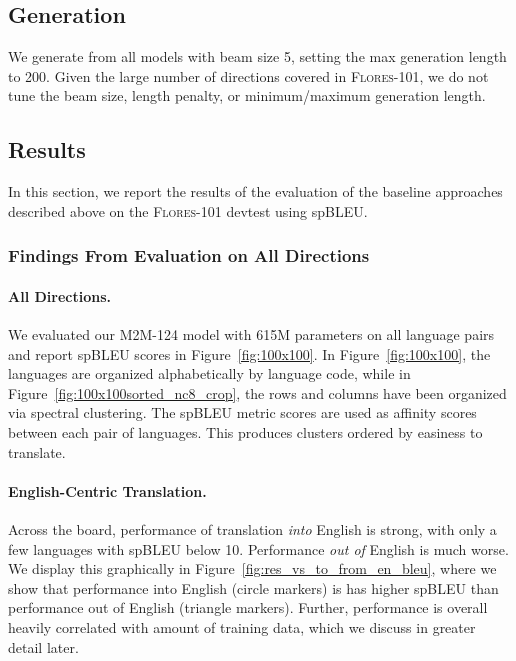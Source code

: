 \subsection{Generation}

We generate from all models with beam size 5, setting the max generation length to 200. Given the large number of directions covered in \textsc{Flores-101}, we do not tune the beam size, length penalty, or minimum/maximum generation length.

\subsection{Results}
In this section, we report the results of the evaluation of the baseline approaches described above on the \textsc{Flores-101} devtest using spBLEU. 

\subsubsection{Findings From Evaluation on All Directions} 

\paragraph{All Directions.} We evaluated our M2M-124 model with 615M parameters on all language pairs and report spBLEU scores in Figure~\ref{fig:100x100}.
In Figure~\ref{fig:100x100}, the languages are organized alphabetically by language code, while in Figure~\ref{fig:100x100sorted_nc8_crop}, the rows and columns have been organized via spectral clustering. The spBLEU metric scores are used as affinity scores between each pair of languages. This produces clusters ordered by easiness to translate. 

\paragraph{English-Centric Translation.} Across the board, performance of translation \textit{into} English is strong, with only a few languages with spBLEU below 10. Performance \textit{out of} English is much worse. We display this graphically in Figure~\ref{fig:res_vs_to_from_en_bleu}, where we show that performance into English (circle markers) is has higher spBLEU than performance out of English (triangle markers). Further, performance is overall heavily correlated with amount of training data, which we discuss in greater detail later.

